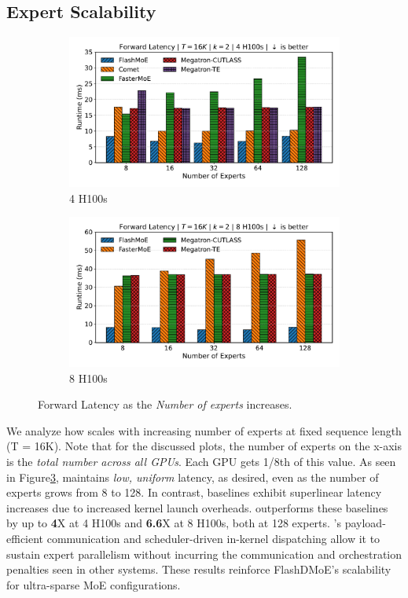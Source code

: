 \subsection{Expert Scalability}\label{subsec:expert-scalability}
\begin{figure}[!h]
    \centering
    \begin{subfigure}{0.49\textwidth}
        \centering
        \includegraphics[width=\linewidth, keepaspectratio]{flash_figs/scaling_experts}
        \caption{4 H100s}
        \label{sub:4gx}
    \end{subfigure}
    \begin{subfigure}{0.49\textwidth}
        \centering
        \includegraphics[width=\linewidth, keepaspectratio]{flash_figs/scaling_experts_8}
        \caption{8 H100s}
        \label{sub:8gx}
    \end{subfigure}
    \caption{Forward Latency as the \emph{Number of experts} increases.}
    \label{fig:xs}
\end{figure}
We analyze how \sysname scales with increasing number of experts at fixed sequence length (T = 16K).
Note that for the discussed plots, the number of experts on the x-axis is the \emph{total number across all GPUs}.
Each GPU gets 1/8th of this value.
As seen in Figure\ref{fig:xs}, \sysname maintains \emph{low, uniform} latency, as desired,
even as the number of experts grows from 8 to 128.
In contrast, baselines exhibit superlinear latency increases due to increased kernel launch overheads.
\sysname outperforms these baselines by up to \textbf{4}X at 4 H100s and \textbf{6.6}X at 8 H100s, both at 128 experts.
\sysname’s payload-efficient communication and scheduler-driven
in-kernel dispatching allow it to sustain expert parallelism
without incurring the communication and orchestration penalties seen in other systems.
These results reinforce FlashDMoE’s scalability for ultra-sparse MoE configurations.

